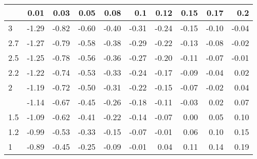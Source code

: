 
\begin{tabular}{lrrrrrrrrr}
\toprule
  & 0.01 & 0.03 & 0.05 & 0.08 & 0.1 & 0.12 & 0.15 & 0.17 & 0.2\\
\midrule
3 & -1.29 & -0.82 & -0.60 & -0.40 & -0.31 & -0.24 & -0.15 & -0.10 & -0.04\\
2.7 & -1.27 & -0.79 & -0.58 & -0.38 & -0.29 & -0.22 & -0.13 & -0.08 & -0.02\\
2.5 & -1.25 & -0.78 & -0.56 & -0.36 & -0.27 & -0.20 & -0.11 & -0.07 & -0.01\\
2.2 & -1.22 & -0.74 & -0.53 & -0.33 & -0.24 & -0.17 & -0.09 & -0.04 & 0.02\\
2 & -1.19 & -0.72 & -0.50 & -0.31 & -0.22 & -0.15 & -0.07 & -0.02 & 0.04\\
\addlinespace
1.7 & -1.14 & -0.67 & -0.45 & -0.26 & -0.18 & -0.11 & -0.03 & 0.02 & 0.07\\
1.5 & -1.09 & -0.62 & -0.41 & -0.22 & -0.14 & -0.07 & 0.00 & 0.05 & 0.10\\
1.2 & -0.99 & -0.53 & -0.33 & -0.15 & -0.07 & -0.01 & 0.06 & 0.10 & 0.15\\
1 & -0.89 & -0.45 & -0.25 & -0.09 & -0.01 & 0.04 & 0.11 & 0.14 & 0.19\\
\bottomrule
\end{tabular}
